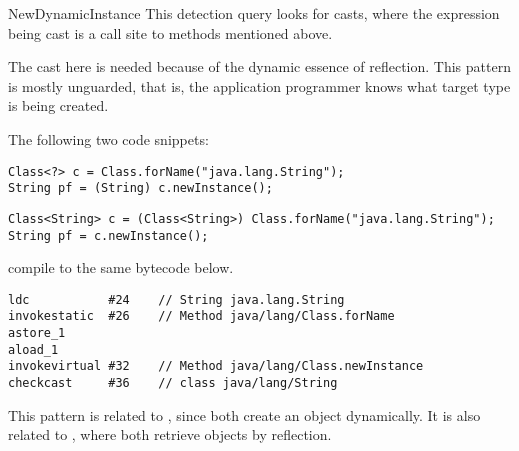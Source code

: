 \begin{pattern}{NewDynamicInstance}
\detection{}
This detection query looks for casts,
where the expression being cast is a call site to methods mentioned above.

\discussion{}
The cast here is needed because of the dynamic essence of reflection.
This pattern is mostly unguarded, that is,
the application programmer knows what target type is being created.

The following two code snippets:

\begin{verbatim}
Class<?> c = Class.forName("java.lang.String");
String pf = (String) c.newInstance();
\end{verbatim}

\begin{verbatim}
Class<String> c = (Class<String>) Class.forName("java.lang.String");
String pf = c.newInstance();
\end{verbatim}

compile to the same bytecode below.

\begin{lstlisting}[style=bytecode]
ldc           #24    // String java.lang.String
invokestatic  #26    // Method java/lang/Class.forName
astore_1
aload_1
invokevirtual #32    // Method java/lang/Class.newInstance
checkcast     #36    // class java/lang/String
\end{lstlisting}

\related{}
This pattern is related to ,
since both create an object dynamically.
It is also related to ,
where both retrieve objects by reflection.

\end{pattern}